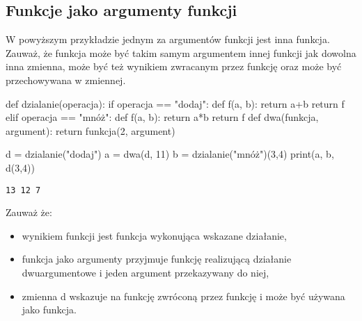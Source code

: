 \subsection{Funkcje jako argumenty funkcji \zaawansowane{**}}\label{Funkcje_jako_argumenty}

W powyższym przykładzie jednym za argumentów funkcji  jest inna funkcja.
Zauważ, że funkcja może być takim samym argumentem innej funkcji jak dowolna inna zmienna,
może być też wynikiem zwracanym przez funkcję oraz może być przechowywana w zmiennej.

\begin{CodeFrame}[python]{0.50\textwidth}
def dzialanie(operacja):
    if operacja == "dodaj":
        def f(a, b):
            return a+b
        return f
    elif operacja == "mnóż":
        def f(a, b):
            return a*b
        return f
def dwa(funkcja, argument):
    return funkcja(2, argument)

d = dzialanie("dodaj")
a = dwa(d, 11)
b = dzialanie("mnóż")(3,4)
print(a, b, d(3,4))
\end{CodeFrame}
\begin{minipage}[t]{0.46\textwidth}
\begin{Verbatim}[frame=single]
13 12 7
\end{Verbatim}

\vspace{6pt}\noindent Zauważ że:
\begin{itemize}[leftmargin=7mm]
\item wynikiem funkcji  jest funkcja wykonująca wskazane działanie,
\item funkcja  jako argumenty przyjmuje funkcję realizującą działanie dwuargumentowe i jeden argument przekazywany do niej,
\item zmienna d wskazuje na funkcję zwróconą przez funkcję  i może być używana jako funkcja.
\end{itemize}
\end{minipage}
